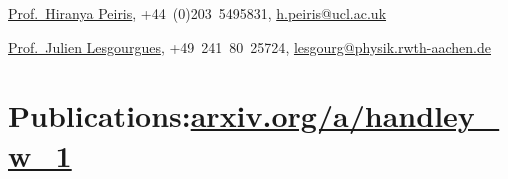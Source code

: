 \documentclass[11pt,a4paper,sans]{moderncv}
\begin{document}
\href{https://www.ucl.ac.uk/cosmoparticle/hiranya-peiris}{Prof.\ Hiranya Peiris}, {+44~(0)203~5495831}, \href{mailto:h.peiris@ucl.ac.uk}{h.peiris@ucl.ac.uk} 

\href{https://www.particle-theory.rwth-aachen.de/go/id/gufe/lidx/1}{Prof.\ Julien Lesgourgues}, {+49~241~80~25724}, \href{mailto:lesgourg@physik.rwth-aachen.de}{lesgourg@physik.rwth-aachen.de} 


\section{Publications:\hfill  \href{https://www.arxiv.org/a/handley_w_1.html}{arxiv.org/a/handley\_w\_1}}


{\small
{}
}
\end{document}
